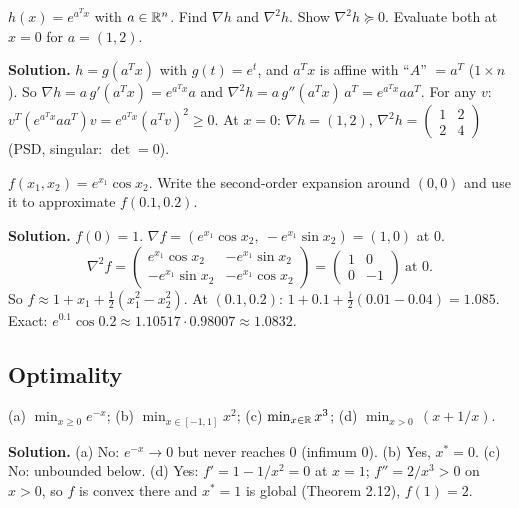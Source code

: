 \begin{example}
$h(x)=e^{a^Tx}$ with $a\in\mathbb{R}^n$. Find $\nabla h$ and $\nabla^2h$. Show $\nabla^2h\succeq0$. Evaluate both at $x=0$ for $a=(1,2)$.

\textbf{Solution.} $h=g(a^Tx)$ with $g(t)=e^t$, and $a^Tx$ is affine with ``$A$'' $=a^T$ ($1\times n$). So $\nabla h=a\,g'(a^Tx)=e^{a^Tx}a$ and
$\nabla^2h = a\,g''(a^Tx)\,a^T = e^{a^Tx}aa^T$. For any $v$: $v^T(e^{a^Tx}aa^T)v = e^{a^Tx}(a^Tv)^2\ge0$.
At $x=0$: $\nabla h=(1,2)$, $\nabla^2h=\begin{pmatrix}1&2\\2&4\end{pmatrix}$ (PSD, singular: $\det=0$).
\end{example}

\begin{example}
$f(x_1,x_2)=e^{x_1}\cos x_2$. Write the second-order expansion around $(0,0)$ and use it to approximate $f(0.1,0.2)$.

\textbf{Solution.} $f(0)=1$. $\nabla f=(e^{x_1}\cos x_2,\ -e^{x_1}\sin x_2)=(1,0)$ at $0$.
\[ \nabla^2f=\begin{pmatrix}e^{x_1}\cos x_2&-e^{x_1}\sin x_2\\-e^{x_1}\sin x_2&-e^{x_1}\cos x_2\end{pmatrix}=\begin{pmatrix}1&0\\0&-1\end{pmatrix}\ \text{at } 0. \]
So $f\approx1+x_1+\tfrac12(x_1^2-x_2^2)$. At $(0.1,0.2)$: $1+0.1+\tfrac12(0.01-0.04)=1.085$. Exact: $e^{0.1}\cos0.2\approx1.10517\cdot0.98007\approx1.0832$.
\end{example}

\subsection{Optimality}

\begin{example}
(a) $\min_{x\ge0}e^{-x}$; (b) $\min_{x\in[-1,1]}x^2$; (c) $\min_{x\in\mathbb{R}}x^3$; (d) $\min_{x>0}\,(x+1/x)$.

\textbf{Solution.} (a) No: $e^{-x}\to0$ but never reaches $0$ (infimum $0$). (b) Yes, $x^*=0$. (c) No: unbounded below.
(d) Yes: $f'=1-1/x^2=0$ at $x=1$; $f''=2/x^3>0$ on $x>0$, so $f$ is convex there and $x^*=1$ is global (Theorem 2.12), $f(1)=2$.
\end{example}

